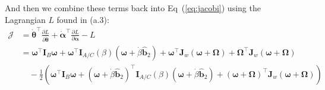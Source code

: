 \documentclass[titlepage]{article}
\begin{document}
And then we combine these terms back into Eq~(\ref{eq:jacobi}) using the Lagrangian $L$ found in (a.3):
\begin{equation}
	\begin{split}
		\mathcal{J}&=\dot{\boldsymbol{\theta}}^\top\frac{\partial L}{\partial\dot{\boldsymbol{\theta}}}+\dot{\boldsymbol{\alpha}}^\top\frac{\partial L}{\partial\dot{\boldsymbol{\alpha}}}-L \\
		&=\boldsymbol{\omega}^\top\boldsymbol{I}_B\boldsymbol{\omega}+\boldsymbol{\omega}^\top\boldsymbol{I}_{A/C}(\beta)\left(\boldsymbol{\omega}+\dot{\beta}\hat{\boldsymbol{b}}_2\right)+\boldsymbol{\omega}^\top\boldsymbol{J}_w\left(\boldsymbol{\omega}+\boldsymbol{\Omega}\right)+\boldsymbol{\Omega}^\top\boldsymbol{J}_w\left(\boldsymbol{\omega}+\boldsymbol{\Omega}\right) \\
		&\quad-\frac{1}{2}\left(\boldsymbol{\omega}^\top\boldsymbol{I}_B\boldsymbol{\omega}+\left(\boldsymbol{\omega}+\dot{\beta}\hat{\boldsymbol{b}}_2\right)^\top\boldsymbol{I}_{A/C}(\beta)\left(\boldsymbol{\omega}+\dot{\beta}\hat{\boldsymbol{b}}_2\right)+\left(\boldsymbol{\omega}+\boldsymbol{\Omega}\right)^\top\boldsymbol{J}_w\left(\boldsymbol{\omega}+\boldsymbol{\Omega}\right)\right)
	\end{split}
	\label{eq:jacobisub}
\end{equation}
\end{document}
